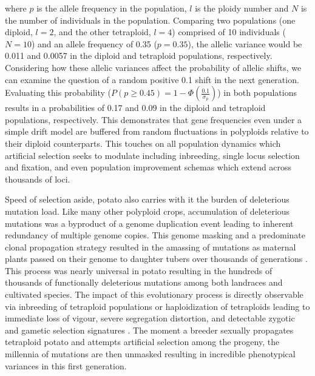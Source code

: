 \begin{refsection}
where \(p\) is the allele frequency in the population, \(l\) is the
ploidy number and \(N\) is the number of individuals in the population.
Comparing two populations (one diploid, \(l = 2\), and the other
tetraploid, \(l = 4\)) comprised of 10 individuals (\(N = 10\)) and an
allele frequency of 0.35 (\(p = 0.35\)), the allelic variance would be
0.011 and 0.0057 in the diploid and tetraploid populations,
respectively. Considering how these allelic variances affect the
probability of allelic shifts, we can examine the question of a random
positive 0.1 shift in the next generation. Evaluating this probability
(\(P(p \geq 0.45) = 1 - \Phi\left(\frac{0.1}{\sigma_p}\right)\)) in both
populations results in a probabilities of 0.17 and 0.09 in the diploid
and tetraploid populations, respectively. This demonstrates that gene
frequencies even under a simple drift model are buffered from random
fluctuations in polyploids relative to their diploid counterparts. This
touches on all population dynamics which artificial selection seeks to
modulate including inbreeding, single locus selection and fixation, and
even population improvement schemas which extend across thousands of
loci.

Speed of selection aside, potato also carries with it the burden of
deleterious mutation load. Like many other polyploid crops, accumulation
of deleterious mutations was a byproduct of a genome duplication event
leading to inherent redundancy of multiple genome copies. This genome
masking and a predominate clonal propagation strategy resulted in the
amassing of mutations as maternal plants passed on their genome to
daughter tubers over thousands of generations \parencite{Lian2019}. This
process was nearly universal in potato resulting in the hundreds of
thousands of functionally deleterious mutations among both landraces and
cultivated species. The impact of this evolutionary process is directly
observable via inbreeding of tetraploid populations or haploidization of
tetraploids leading to immediate loss of vigour, severe segregation
distortion, and detectable zygotic and gametic selection signatures
\parencite{Zhang2019,Song2023}. The moment a breeder sexually propagates
tetraploid potato and attempts artificial selection among the progeny,
the millennia of mutations are then unmasked resulting in incredible
phenotypical variances in this first generation.


\end{refsection}
